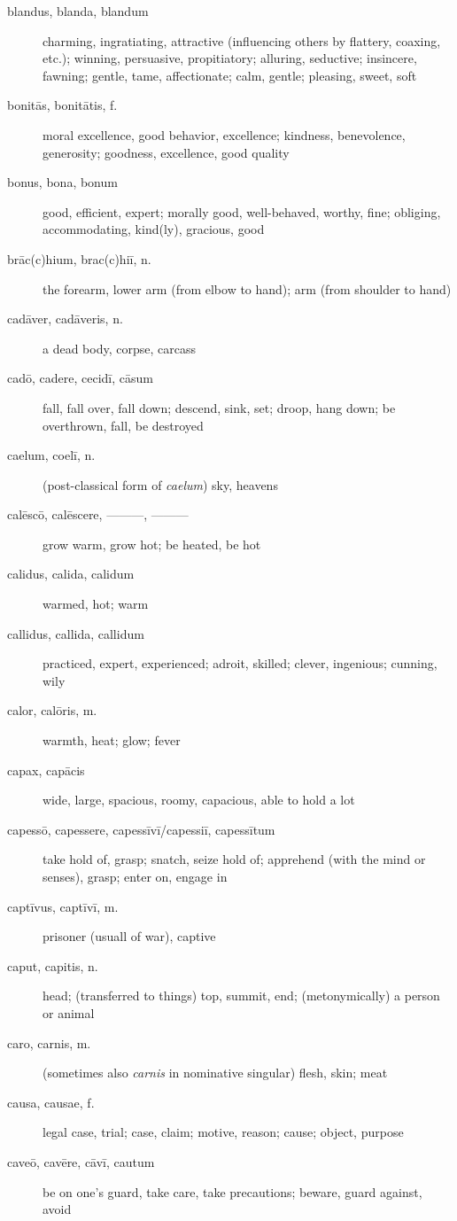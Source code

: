 \begin{description}
    \item[blandus, blanda, blandum] charming, ingratiating, attractive (influencing others by flattery, coaxing, etc.); winning, persuasive, propitiatory; alluring, seductive; insincere, fawning; gentle, tame, affectionate; calm, gentle; pleasing, sweet, soft
    \item[bonitās, bonitātis, f.] moral excellence, good behavior, excellence; kindness, benevolence, generosity; goodness, excellence, good quality
    \item[bonus, bona, bonum] good, efficient, expert; morally good, well-behaved, worthy, fine; obliging, accommodating, kind(ly), gracious, good
    \item[brāc(c)hium, brac(c)hiī, n.]  the forearm, lower arm (from elbow to hand); arm (from shoulder to hand)
    \item[cadāver, cadāveris, n.] a dead body, corpse, carcass
    \item[cadō, cadere, cecidī, cāsum] fall, fall over, fall down; descend, sink, set; droop, hang down; be overthrown, fall, be destroyed
    \item[caelum, coelī, n.] (post-classical form of \textit{caelum}) sky, heavens
    \item[calēscō, calēscere, ———, ———] grow warm, grow hot; be heated, be hot
    \item[calidus, calida, calidum] warmed, hot; warm
    \item[callidus, callida, callidum] practiced, expert, experienced; adroit, skilled; clever, ingenious; cunning, wily
    \item[calor, calōris, m.] warmth, heat; glow; fever
    \item[capax, capācis] wide, large, spacious, roomy, capacious, able to hold a lot
    \item[capessō, capessere, capessīvī/capessiī, capessītum] take hold of, grasp; snatch, seize hold of; apprehend (with the mind or senses), grasp; enter on, engage in
    \item[captīvus, captīvī, m.] prisoner (usuall of war), captive
    \item[caput, capitis, n.] head; (transferred to things) top, summit, end; (metonymically) a person or animal
    \item[caro, carnis, m.] (sometimes also \textit{carnis} in nominative singular) flesh, skin; meat
    \item[causa, causae, f.] legal case, trial; case, claim; motive, reason; cause; object, purpose
    \item[caveō, cavēre, cāvī, cautum] be on one's guard, take care, take precautions; beware, guard against, avoid

\end{description}
